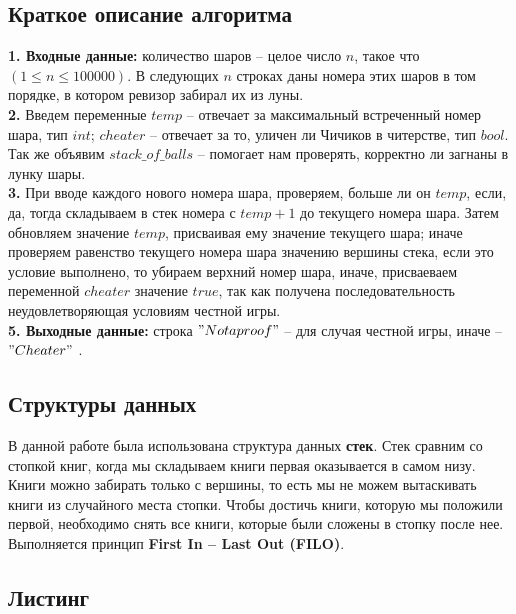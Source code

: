 \documentclass[a5paper, 10pt]{article}
\theoremstyle{definition}
\theoremstyle{plain}
\theoremstyle{remark}
\begin{document}
\subsection{Краткое описание алгоритма}
\textbf{1. Входные данные:} количество шаров -- целое число $n$, такое что $(1 \leq n \leq 100000)$. В следующих $n$ строках даны номера этих шаров в том порядке, в котором ревизор забирал их из луны. \\
\textbf{2.} Введем переменные $temp$ -- отвечает за максимальный встреченный номер шара, тип $int$; $cheater$ -- отвечает за то, уличен ли Чичиков в читерстве, тип $bool$. Так же объявим $stack\_of\_balls$ -- помогает нам проверять, корректно ли загнаны в лунку шары. \\
\textbf{3.} При вводе каждого нового номера шара, проверяем, больше ли он $temp$, если, да, тогда складываем в стек номера с $temp + 1$ до текущего номера шара. Затем обновляем значение $temp$, присваивая ему значение текущего шара; иначе проверяем равенство текущего номера шара значению вершины стека, если это условие выполнено, то убираем верхний номер шара, иначе, присваеваем переменной $cheater$ значение $true$, так как получена последовательность неудовлетворяющая условиям честной игры. \\
\textbf{5. Выходные данные:} строка $"Not a proof"$ -- для случая честной игры, иначе -- $"Cheater"$ .

\subsection{Структуры данных}
В данной работе была использована структура данных \textbf{стек}. Стек сравним со стопкой книг, когда мы складываем книги первая оказывается в самом низу. Книги можно забирать только с вершины, то есть мы не можем вытаскивать книги из случайного места стопки. Чтобы достичь книги, которую мы положили первой, необходимо снять все книги, которые были сложены в стопку после нее. Выполняется принцип \textbf{First In -- Last Out (FILO)}.

\newpage
\subsection{Листинг}
\end{document}
